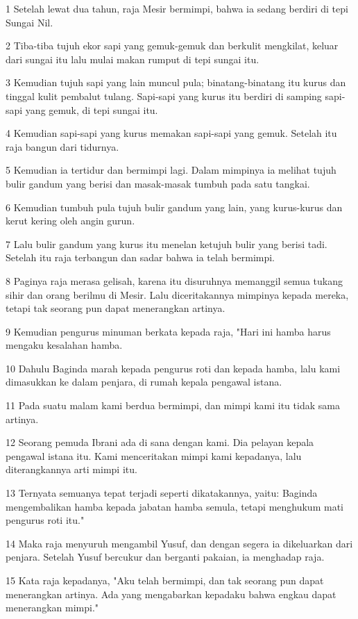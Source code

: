 \par 1 Setelah lewat dua tahun, raja Mesir bermimpi, bahwa ia sedang berdiri di tepi Sungai Nil.
\par 2 Tiba-tiba tujuh ekor sapi yang gemuk-gemuk dan berkulit mengkilat, keluar dari sungai itu lalu mulai makan rumput di tepi sungai itu.
\par 3 Kemudian tujuh sapi yang lain muncul pula; binatang-binatang itu kurus dan tinggal kulit pembalut tulang. Sapi-sapi yang kurus itu berdiri di samping sapi-sapi yang gemuk, di tepi sungai itu.
\par 4 Kemudian sapi-sapi yang kurus memakan sapi-sapi yang gemuk. Setelah itu raja bangun dari tidurnya.
\par 5 Kemudian ia tertidur dan bermimpi lagi. Dalam mimpinya ia melihat tujuh bulir gandum yang berisi dan masak-masak tumbuh pada satu tangkai.
\par 6 Kemudian tumbuh pula tujuh bulir gandum yang lain, yang kurus-kurus dan kerut kering oleh angin gurun.
\par 7 Lalu bulir gandum yang kurus itu menelan ketujuh bulir yang berisi tadi. Setelah itu raja terbangun dan sadar bahwa ia telah bermimpi.
\par 8 Paginya raja merasa gelisah, karena itu disuruhnya memanggil semua tukang sihir dan orang berilmu di Mesir. Lalu diceritakannya mimpinya kepada mereka, tetapi tak seorang pun dapat menerangkan artinya.
\par 9 Kemudian pengurus minuman berkata kepada raja, "Hari ini hamba harus mengaku kesalahan hamba.
\par 10 Dahulu Baginda marah kepada pengurus roti dan kepada hamba, lalu kami dimasukkan ke dalam penjara, di rumah kepala pengawal istana.
\par 11 Pada suatu malam kami berdua bermimpi, dan mimpi kami itu tidak sama artinya.
\par 12 Seorang pemuda Ibrani ada di sana dengan kami. Dia pelayan kepala pengawal istana itu. Kami menceritakan mimpi kami kepadanya, lalu diterangkannya arti mimpi itu.
\par 13 Ternyata semuanya tepat terjadi seperti dikatakannya, yaitu: Baginda mengembalikan hamba kepada jabatan hamba semula, tetapi menghukum mati pengurus roti itu."
\par 14 Maka raja menyuruh mengambil Yusuf, dan dengan segera ia dikeluarkan dari penjara. Setelah Yusuf bercukur dan berganti pakaian, ia menghadap raja.
\par 15 Kata raja kepadanya, "Aku telah bermimpi, dan tak seorang pun dapat menerangkan artinya. Ada yang mengabarkan kepadaku bahwa engkau dapat menerangkan mimpi."
